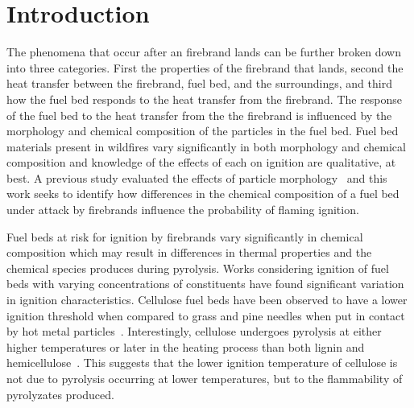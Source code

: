 \section{Introduction}\addvspace{10pt}
\label{sec:introduction3}
    
    The phenomena that occur after an firebrand lands can be further broken down into three categories. First the properties of the firebrand that lands, second the heat transfer between the firebrand, fuel bed, and the surroundings, and third how the fuel bed responds to the heat transfer from the firebrand. The response of the fuel bed to the heat transfer from the the firebrand is influenced by the morphology and chemical composition of the particles in the fuel bed. Fuel bed materials present in wildfires vary significantly in both morphology and chemical composition and knowledge of the effects of each on ignition are qualitative, at best. A previous study evaluated the effects of particle morphology~\cite{Bean2021} and this work seeks to identify how differences in the chemical composition of a fuel bed under attack by firebrands influence the probability of flaming ignition. 
    
    Fuel beds at risk for ignition by firebrands vary significantly in chemical composition which may result in differences in thermal properties and the chemical species produces during pyrolysis. Works considering ignition of fuel beds with varying concentrations of constituents have found significant variation in ignition characteristics. Cellulose fuel beds have been observed to have a lower ignition threshold when compared to grass and pine needles when put in contact by hot metal particles~\cite{Urban2018}. Interestingly, cellulose undergoes pyrolysis at either higher temperatures or later in the heating process than both lignin and hemicellulose~\cite{Yang2007a, Shotorban2018}. This suggests that the lower ignition temperature of cellulose is not due to pyrolysis occurring at lower temperatures, but to the flammability of pyrolyzates produced. 
    
